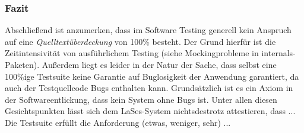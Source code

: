 \subsubsection{Fazit}
Abschließend ist anzumerken, dass im Software Testing generell kein Anspruch auf eine \emph{Quelltextüberdeckung}
von 100\% besteht.
Der Grund hierfür ist die Zeitintensivität von ausführlichem Testing (siehe Mockingprobleme in internals-Paketen).
Außerdem liegt es leider in der Natur der Sache, dass selbst eine 100\%ige Testsuite keine Garantie auf Buglosigkeit
der Anwendung garantiert, da auch der Testquellcode Bugs enthalten kann.
Grundsätzlich ist es ein Axiom in der Softwareentlickung, dass kein System ohne Bugs ist.
Unter allen diesen Gesichtspunkten lässt sich dem LaSes-System nichtsdestrotz attestieren, dass ...
Die Testsuite erfüllt die Anforderung (etwas, weniger, sehr) ...